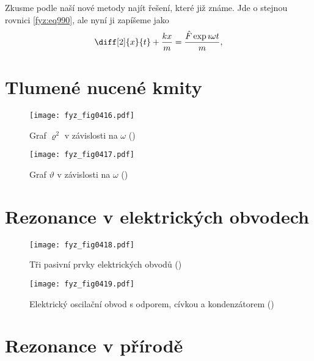     Zkusme podle naší nové metody najít řešení, které již známe. Jde o stejnou rovnici
    \eqref{fyz:eq990}, ale nyní ji zapíšeme jako
    \begin{equation}\label{fyz:eq991}
      \diff[2]{x}{t}+\frac{kx}{m}=\frac{\hat{F}\exp{\imath\omega t}}{m},
    \end{equation}

  \section{Tlumené nucené kmity}\label{fyz:IchapXXIIIsecII}

    \begin{figure}[ht!] %
      \centering
      \texttt{[image: fyz\_fig0416.pdf]}
      \caption{Graf \(\varrho^2\) v závislosti na \(\omega\)
              (\cite[s.~313]{Feynman01})}
      \label{fyz:fig0416}
    \end{figure}

    \begin{figure}[ht!] %
      \centering
      \texttt{[image: fyz\_fig0417.pdf]}
      \caption{Graf \(\vartheta\) v závislosti na \(\omega\)
               (\cite[s.~314]{Feynman01})}
      \label{fyz:fig0417}
    \end{figure}

  \section{Rezonance v elektrických obvodech}\label{fyz:IchapXXIIIsecIII}

    \begin{figure}[ht!] %
      \centering
      \texttt{[image: fyz\_fig0418.pdf]}
      \caption{Tři pasivní prvky elektrických obvodů
              (\cite[s.~315]{Feynman01})}
      \label{fyz:fig0418}
    \end{figure}

    \begin{figure}[ht!] %
      \centering
      \texttt{[image: fyz\_fig0419.pdf]}
      \caption{Elektrický oscilační obvod s odporem, cívkou a kondenzátorem
               (\cite[s.~316]{Feynman01})}
      \label{fyz:fig0419}
    \end{figure}

  \section{Rezonance v přírodě}\label{fyz:IchapXXIIIsecIV}


